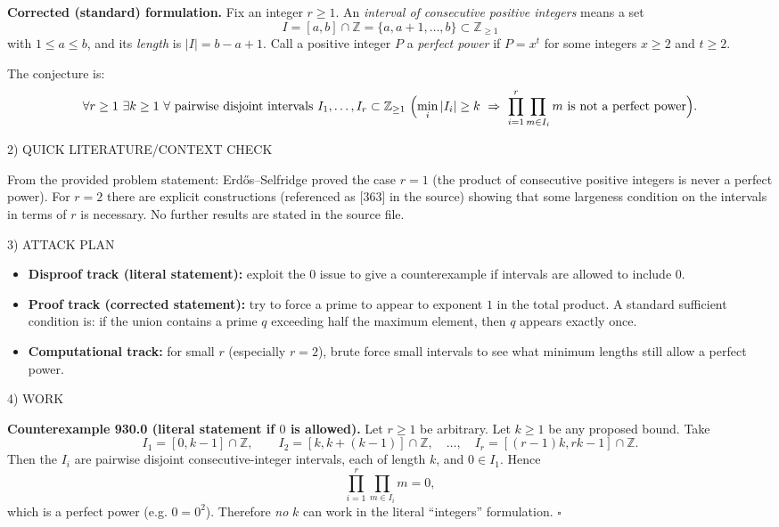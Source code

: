 \medskip
\noindent\textbf{Corrected (standard) formulation.}
Fix an integer $r\ge 1$. An \emph{interval of consecutive positive integers} means a set
\[
I=[a,b]\cap\mathbb Z=\{a,a+1,\dots,b\}\subset\mathbb Z_{\ge 1}
\]
with $1\le a\le b$, and its \emph{length} is $|I|=b-a+1$.
Call a positive integer $P$ a \emph{perfect power} if $P=x^t$ for some integers $x\ge 2$ and $t\ge 2$.

The conjecture is:
\[
\forall r\ge 1\ \exists k\ge 1\ \forall\text{ pairwise disjoint intervals }I_1,\dots,I_r\subset\mathbb Z_{\ge1}
\ \Bigl(\min_i |I_i|\ge k\ \Rightarrow\ \prod_{i=1}^r\prod_{m\in I_i} m\ \text{is not a perfect power}\Bigr).
\]

2) QUICK LITERATURE/CONTEXT CHECK

From the provided problem statement: Erd\H{o}s--Selfridge proved the case $r=1$ (the product of consecutive positive integers is never a perfect power). For $r=2$ there are explicit constructions (referenced as [363] in the source) showing that some largeness condition on the intervals in terms of $r$ is necessary. No further results are stated in the source file.

3) ATTACK PLAN

\begin{itemize}
\item \textbf{Disproof track (literal statement):} exploit the $0$ issue to give a counterexample if intervals are allowed to include $0$.
\item \textbf{Proof track (corrected statement):} try to force a prime to appear to exponent $1$ in the total product. A standard sufficient condition is: if the union contains a prime $q$ exceeding half the maximum element, then $q$ appears exactly once.
\item \textbf{Computational track:} for small $r$ (especially $r=2$), brute force small intervals to see what minimum lengths still allow a perfect power.
\end{itemize}

4) WORK

\textbf{Counterexample 930.0 (literal statement if $0$ is allowed).}
Let $r\ge 1$ be arbitrary. Let $k\ge 1$ be any proposed bound. Take
\[
I_1=[0,k-1]\cap\mathbb Z,\qquad I_2=[k,k+(k-1)]\cap\mathbb Z,\quad\dots,\quad I_r=[(r-1)k,rk-1]\cap\mathbb Z.
\]
Then the $I_i$ are pairwise disjoint consecutive-integer intervals, each of length $k$, and $0\in I_1$. Hence
\[
\prod_{i=1}^r\prod_{m\in I_i} m = 0,
\]
which is a perfect power (e.g. $0=0^2$). Therefore \emph{no} $k$ can work in the literal ``integers'' formulation.
\hfill$\square$

